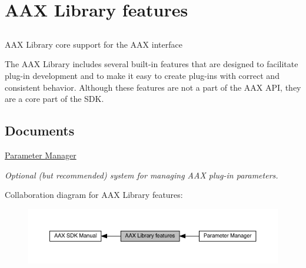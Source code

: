 \hypertarget{a00343}{}\section{A\+A\+X Library features}
\label{a00343}


\subsection{ }
A\+A\+X Library core support for the A\+A\+X interface 

The A\+A\+X Library includes several built-\/in features that are designed to facilitate plug-\/in development and to make it easy to create plug-\/ins with correct and consistent behavior. Although these features are not a part of the A\+A\+X A\+P\+I, they are a core part of the S\+D\+K. \subsection*{Documents}
\begin{DoxyCompactItemize}
\item 
\hyperlink{a00344}{Parameter Manager}
\begin{DoxyCompactList}\small\item\em Optional (but recommended) system for managing A\+A\+X plug-\/in parameters. \end{DoxyCompactList}\end{DoxyCompactItemize}
Collaboration diagram for A\+A\+X Library features\+:
\nopagebreak
\begin{figure}[H]
\begin{center}
\leavevmode
\includegraphics[width=350pt]{a00343}
\end{center}
\end{figure}
